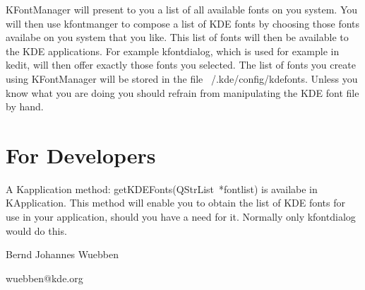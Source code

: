 \documentclass{article}
\begin{document}
KFontManager will present to you a list of all available fonts on you
system. You will then use kfontmanger to compose a list of KDE fonts
by choosing those fonts availabe on you system that you like. This list
of fonts will then be available to the KDE applications. For example kfontdialog,
which is used for example in kedit, will then offer exactly those fonts
you selected. The list of fonts you create using KFontManager will be stored
in the file ~/.kde/config/kdefonts. Unless you know what you are doing
you should refrain from manipulating the KDE font file by hand.


\section{For Developers}



A Kapplication method: getKDEFonts(QStrList~*fontlist) is availabe 
in KApplication. This method will enable you to obtain the
list of KDE fonts for use in your application, should you have a need for
it. Normally only kfontdialog would do this. 



{\ttfamily Bernd Johannes Wuebben}

wuebben@kde.org
\end{document}
